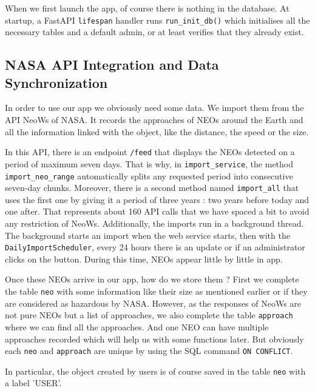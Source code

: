 \bigskip

When we first launch the app, of course there is nothing in the database. At startup, a FastAPI \texttt{lifespan} handler runs \texttt{run\_init\_db()} which initialises all the necessary tables and a default admin, or at least verifies that they already exist.



\subsection{NASA API Integration and Data Synchronization}

\bigskip
\bigskip

In order to use our app we obviously need some data. We import them from the API NeoWs of NASA. It records the approaches of NEOs around the Earth and all the information linked with the object, like the distance, the speed or the size.

\bigskip

In this API, there is an endpoint \texttt{/feed} that displays the NEOs detected on a period of maximum seven days. That is why, in \texttt{import\_service}, the method \texttt{import\_neo\_range} automatically splits any requested period into consecutive seven-day chunks. Moreover, there is a second method named \texttt{import\_all} that uses the first one by giving it a period of three years : two years before today and one after. That represents about 160 API calls that we have spaced a bit to avoid any restriction of NeoWs. Additionally, the imports run in a background thread. The background starts an import when the web service starts, then with the \texttt{DailyImportScheduler}, every 24 hours there is an update or if an administrator clicks on the button. During this time, NEOs appear little by little in app.

\bigskip

Once these NEOs arrive in our app, how do we store them ? First we complete the table \texttt{neo} with some information like their size as mentioned earlier or if they are considered as hazardous by NASA. However, as the responses of NeoWs are not pure NEOs but a list of approaches, we also complete the table \texttt{approach} where we can find all the approaches. And one NEO can have multiple approaches recorded which will help us with some functions later. But obviously each \texttt{neo} and \texttt{approach} are unique by using the SQL command \texttt{ON CONFLICT}.


In particular, the object created by users is of course saved in the table \texttt{neo} with a label 'USER'.
    
